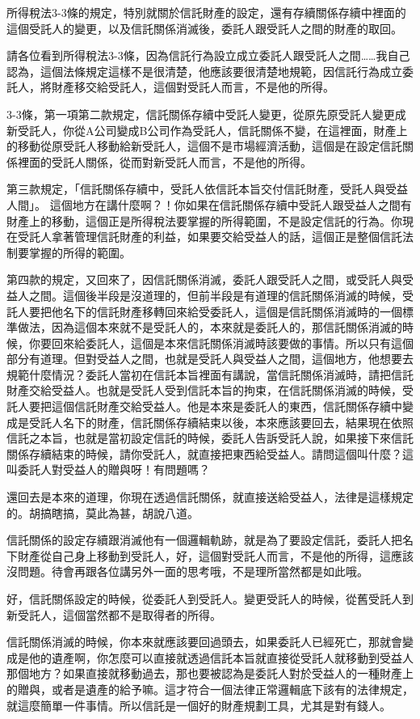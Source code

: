 \documentclass[oneside,sub3section]{ctexbook}
\begin{document}
所得稅法3-3條的規定，特別就關於信託財產的設定，還有存續關係存續中裡面的這個受託人的變更，以及信託關係消滅後，委託人跟受託人之間的財產的取回。

請各位看到所得稅法3-3條，因為信託行為設立成立委託人跟受託人之間\ldots\ldots 我自己認為，這個法條規定這樣不是很清楚，他應該要很清楚地規範，因信託行為成立委託人，將財產移交給受託人，這個對受託人而言，不是他的所得。

3-3條，第一項第二款規定，信託關係存續中受託人變更，從原先原受託人變更成新受託人，你從A公司變成B公司作為受託人，信託關係不變，在這裡面，財產上的移動從原受託人移動給新受託人，這個不是市場經濟活動，這個是在設定信託關係裡面的受託人關係，從而對新受託人而言，不是他的所得。

第三款規定，「信託關係存續中，受託人依信託本旨交付信託財產，受託人與受益人間」。
這個地方在講什麼啊？！你如果在信託關係存續中受託人跟受益人之間有財產上的移動，這個正是所得稅法要掌握的所得範圍，不是設定信託的行為。你現在受託人拿著管理信託財產的利益，如果要交給受益人的話，這個正是整個信託法制要掌握的所得的範圍。

第四款的規定，又回來了，因信託關係消滅，委託人跟受託人之間，或受託人與受益人之間。這個後半段是沒道理的，但前半段是有道理的信託關係消滅的時候，受託人要把他名下的信託財產移轉回來給受委託人，這個是信託關係消滅時的一個標準做法，因為這個本來就不是受託人的，本來就是委託人的，那信託關係消滅的時候，你要回來給委託人，這個是本來信託關係消滅時該要做的事情。所以只有這個部分有道理。但對受益人之間，也就是受託人與受益人之間，這個地方，他想要去規範什麼情況？委託人當初在信託本旨裡面有講說，當信託關係消滅時，請把信託財產交給受益人。也就是受託人受到信託本旨的拘束，在信託關係消滅的時候，受託人要把這個信託財產交給受益人。他是本來是委託人的東西，信託關係存續中變成是受託人名下的財產，信託關係存續結束以後，本來應該要回去，結果現在依照信託之本旨，也就是當初設定信託的時候，委託人告訴受託人說，如果接下來信託關係存續結束的時候，請你受託人，就直接把東西給受益人。請問這個叫什麼？這叫委託人對受益人的贈與呀！有問題嗎？

還回去是本來的道理，你現在透過信託關係，就直接送給受益人，法律是這樣規定的。胡搞瞎搞，莫此為甚，胡說八道。

信託關係的設定存續跟消滅他有一個邏輯軌跡，就是為了要設定信託，委託人把名下財產從自己身上移動到受託人，好，這個對受託人而言，不是他的所得，這應該沒問題。待會再跟各位講另外一面的思考哦，不是理所當然都是如此哦。

好，信託關係設定的時候，從委託人到受託人。變更受託人的時候，從舊受託人到新受託人，這個當然都不是取得者的所得。

信託關係消滅的時候，你本來就應該要回過頭去，如果委託人已經死亡，那就會變成是他的遺產啊，你怎麼可以直接就透過信託本旨就直接從受託人就移動到受益人那個地方？如果直接就移動過去，那也要被認為是委託人對於受益人的一種財產上的贈與，或者是遺產的給予嘛。這才符合一個法律正常邏輯底下該有的法律規定，就這麼簡單一件事情。所以信託是一個好的財產規劃工具，尤其是對有錢人。
\end{document}
